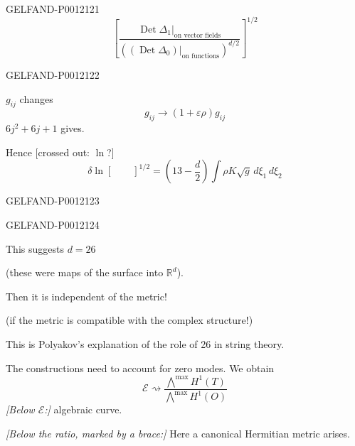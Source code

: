 \begin{GelfandAdjacentEvidence}{GELFAND-P001212}{1}
\[
\left[
\frac{\left.\operatorname{Det}\Delta_1\right|_{\text{on vector fields}}}
{\left(\left.(\operatorname{Det}\Delta_0)\right|_{\text{on functions}}\right)^{d/2}}
\right]^{1/2}
\]
\end{GelfandAdjacentEvidence}
\begin{GelfandAdjacentEvidence}{GELFAND-P001212}{2}


\(g_{ij}\) changes
\[
g_{ij}\longrightarrow(1+\varepsilon\rho)g_{ij}
\]
\(6j^2+6j+1\) gives.

Hence [crossed out: \(\ln\)?]
\[
\delta\ln[\qquad]^{1/2}=\left(13-\frac d2\right)
\int\rho K\sqrt g\,d\xi_1\,d\xi_2
\]
\end{GelfandAdjacentEvidence}
\begin{GelfandAdjacentEvidence}{GELFAND-P001212}{3}

\end{GelfandAdjacentEvidence}
\begin{GelfandAdjacentEvidence}{GELFAND-P001212}{4}


This suggests \(d=26\)

(these were maps of the surface into \(\mathbb R^d\)).

Then it is independent of the metric!

(if the metric is compatible with the complex structure!)

This is Polyakov’s explanation of the role of 26 in string theory.

The constructions need to account for zero modes. We obtain
\[
\mathcal E\rightsquigarrow
\frac{\bigwedge^{\max}H^1(T)}{\bigwedge^{\max}H^1(O)}
\]
\textit{[Below \(\mathcal E\):]} algebraic curve.

\textit{[Below the ratio, marked by a brace:]} Here a canonical Hermitian metric arises.
\end{GelfandAdjacentEvidence}



